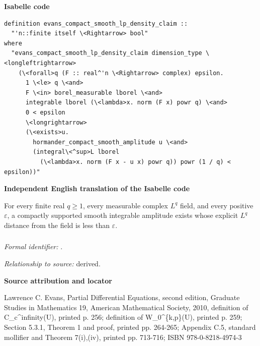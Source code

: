 \documentclass[10pt,oneside]{article}
\newcommand{\reviewlabel}[1]{\par\smallskip\noindent\textsf{\bfseries #1}\par\smallskip}
\begin{document}
\reviewlabel{Isabelle code}
\begin{lstlisting}
definition evans_compact_smooth_lp_density_claim ::
  "'n::finite itself \<Rightarrow> bool"
where
  "evans_compact_smooth_lp_density_claim dimension_type \<longleftrightarrow>
    (\<forall>q (F :: real^'n \<Rightarrow> complex) epsilon.
      1 \<le> q \<and>
      F \<in> borel_measurable lborel \<and>
      integrable lborel (\<lambda>x. norm (F x) powr q) \<and>
      0 < epsilon
      \<longrightarrow>
      (\<exists>u.
        hormander_compact_smooth_amplitude u \<and>
        (integral\<^sup>L lborel
          (\<lambda>x. norm (F x - u x) powr q)) powr (1 / q) < epsilon))"
\end{lstlisting}

\reviewlabel{Independent English translation of the Isabelle code}
For every finite real $q\geq1$, every measurable complex $L^q$ field, and every positive $\varepsilon$, a compactly supported smooth integrable amplitude exists whose explicit $L^q$ distance from the field is less than $\varepsilon$.

\subsubsection{\texttt{}}
\noindent\textit{Formal identifier:} \texttt{}.\par
\noindent\textit{Relationship to source:} derived.

\reviewlabel{Source attribution and locator}
Lawrence C. Evans, Partial Differential Equations, second edition, Graduate Studies in Mathematics 19, American Mathematical Society, 2010, definition of C\_c\textasciicircum{}infinity(U), printed p. 256; definition of W\_0\textasciicircum{}\{k,p\}(U), printed p. 259; Section 5.3.1, Theorem 1 and proof, printed pp. 264-265; Appendix C.5, standard mollifier and Theorem 7(i),(iv), printed pp. 713-716; ISBN 978-0-8218-4974-3
\end{document}
